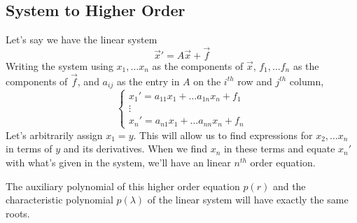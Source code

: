 \subsection{System to Higher Order}
Let's say we have the linear system
\begin{equation*}
	\vec{x}' = A\vec{x} + \vec{f}
\end{equation*}
Writing the system using $x_1, \ldots x_n$ as the components of $\vec{x}$, $f_1, \ldots f_n$ as the components of $\vec{f}$, and $a_{ij}$ as the entry in $A$ on the $i^{th}$ row and $j^{th}$ column,
\begin{equation*}
	\begin{cases}
		x_1' = a_{11}x_1 + \ldots a_{1n}x_n + f_1 \\
		\vdots \\
		x_n' = a_{n1}x_1 + \ldots a_{nn}x_n + f_n
	\end{cases}
\end{equation*}
Let's arbitrarily assign $x_1 = y$. This will allow us to find expressions for $x_2, \ldots x_n$ in terms of $y$ and its derivatives. When we find $x_n$ in these terms and equate $x_n'$ with what's given in the system, we'll have an linear $n^{th}$ order equation.



\noindent
The auxiliary polynomial of this higher order equation $p(r)$ and the characteristic polynomial $p(\lambda)$ of the linear system will have exactly the same roots.